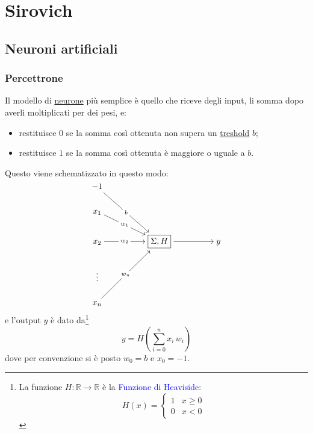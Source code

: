 \documentclass[10pt]{book}
\newcommand{\1}{\mathds{1}}
\newcommand{\R}{\mathds{R}}
\theoremstyle{definition}%
\theoremstyle{plain}
\theoremstyle{remark}
\renewcommand{\href}[2]{\textcolor{blue}{#2}}
\begin{document}
\part{Sirovich}
\chapter{Neuroni artificiali}
\label{sec:orgffd9135}

\section{Percettrone}
\label{sec:orgeb1a924}
Il modello di \hyperref[sec:org779563c]{neurone} più semplice è quello che riceve degli input, li somma dopo averli moltiplicati per dei pesi, e:
\begin{itemize}
\item restituisce \(0\) se la somma così ottenuta non supera un \uline{treshold} \(b\);
\item restituisce \(1\) se la somma così ottenuta è maggiore o uguale a \(b\).
\end{itemize}

Questo viene schematizzato in questo modo:
\begin{equation*}
\begin{tikzcd}[ampersand replacement=\&,cramped]
	{-1} \\
	{x_1} \\
	{x_2} \&\& {\boxed{\Sigma, H}} \&\& y \\
	\vdots \\
	{x_n}
	\arrow["b"{description}, from=1-1, to=3-3]
	\arrow["{w_1}"{description}, from=2-1, to=3-3]
	\arrow["{w_2}"{description}, from=3-1, to=3-3]
	\arrow[from=3-3, to=3-5]
	\arrow["{w_n}"{description}, from=5-1, to=3-3]
\end{tikzcd}
\end{equation*}
e l'output \(y\) è dato da\footnote{La funzione \(H:\R\to \R\) è la \href{../../../../../org/roam/20250624161413-funzione_di_heaviside.org}{Funzione di Heaviside}:
\begin{equation*}
H(x) = \begin{cases}
1 & x\ge 0\\
0 & x<0
\end{cases}
\end{equation*}}
\begin{equation*}
y=H\left(\sum_{i=0}^{n} x_{i}\,w_{i}\right)
\end{equation*}
dove per convenzione si è posto \(w_{0}=b\) e \(x_{0}=-1\).
\end{document}
